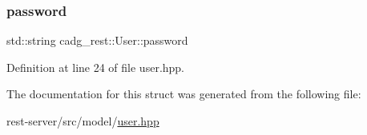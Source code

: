 \mbox{\label{structcadg__rest_1_1_user_af003ad05b0063f7ffcda61fc31ee5523}} 
\subsubsection{\texorpdfstring{password}{password}}
{\footnotesize\ttfamily std\+::string cadg\+\_\+rest\+::\+User\+::password}



Definition at line 24 of file user.\+hpp.



The documentation for this struct was generated from the following file\+:\begin{DoxyCompactItemize}
\item 
rest-\/server/src/model/\mbox{\hyperlink{user_8hpp}{user.\+hpp}}\end{DoxyCompactItemize}
